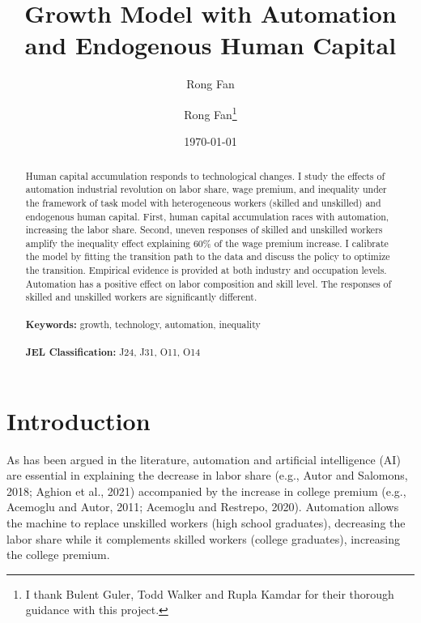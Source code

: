 \documentclass[12pt]{article}
\date{}
\author{Rong Fan}
\begin{document}
\begin{titlepage}
\title{Growth Model with Automation and Endogenous Human Capital}
\author{Rong Fan\thanks{I thank Bulent Guler, Todd Walker and Rupla Kamdar for their thorough guidance with this project.}}
\date{\today}
\maketitle
\begin{abstract}
\noindent Human capital accumulation responds to technological changes. I study the effects of automation industrial revolution on labor share, wage premium, and inequality under the framework of task model with heterogeneous workers (skilled and unskilled) and endogenous human capital. First, human capital accumulation races with automation, increasing the labor share. Second, uneven responses of skilled and unskilled workers amplify the inequality effect explaining 60\% of the wage premium increase. I calibrate the model by fitting the transition path to the data and discuss the policy to optimize the transition. Empirical evidence is provided at both industry and occupation levels. Automation has a positive effect on labor composition and skill level. The responses of skilled and unskilled workers are significantly different. \\
\vspace{0in}\\
\noindent\textbf{Keywords:} growth, technology, automation, inequality\\
\vspace{0in}\\
\noindent\textbf{JEL Classification: } J24, J31, O11, O14\\

\bigskip
\end{abstract}
\setcounter{page}{0}
\thispagestyle{empty}
\end{titlepage}
\pagebreak \newpage

\section{Introduction}
As has been argued in the literature, automation and artificial intelligence (AI) are essential in explaining the decrease in labor share (e.g., Autor and Salomons, 2018\cite{AutorSalomons2018}; Aghion et al., 2021\nocite{Aghionetal2021}) accompanied by the increase in college premium (e.g., Acemoglu and Autor, 2011\nocite{AcemogluAutor2011}; Acemoglu and Restrepo, 2020\nocite{AcemogluRestrepo2020}). Automation allows the machine to replace unskilled workers (high school graduates), decreasing the labor share while it complements skilled workers (college graduates), increasing the college premium.
\end{document}
